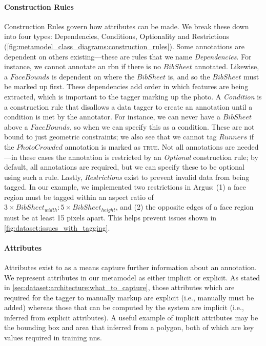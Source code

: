\paragraph{Construction Rules} 

Construction Rules govern how attributes can be made. We break these down into four types: Dependencies, Conditions, Optionality and Restrictions (\cref{fig:metamodel_class_diagrams:construction_rules}). Some annotations are dependent on others existing---these are rules that we name \textit{Dependencies}. For instance, we cannot annotate an \gls{rbn} if there is no $BibSheet$ annotated. Likewise, a $FaceBounds$ is dependent on where the $BibSheet$ is, and so the $BibSheet$ must be marked up first. These dependencies add order in which features are being extracted, which is important to the tagger marking up the photo. A \textit{Condition} is a construction rule that disallows a data tagger to create an annotation until a condition is met by the annotator. For instance, we can never have a $BibSheet$ above a $FaceBounds$, so when we can specify this as a condition. These are not bound to just geometric constraints; we also see that we cannot tag $Runners$ if the $PhotoCrowded$ annotation is marked as \textsc{true}. Not all annotations are needed---in these cases the annotation is restricted by an \textit{Optional} construction rule; by default, all annotations are required, but we can specify these to be optional using such a rule. Lastly, \textit{Restrictions} exist to prevent invalid data from being tagged. In our example, we implemented two restrictions in Argus: (1) a face region must be tagged within an aspect ratio of $3 \times BibSheet_{width} : 5 \times BibSheet_{height}$, and (2) the opposite edges of a face region must be at least 15 pixels apart. This helps prevent issues shown in \cref{fig:dataset:issues_with_tagging}.


\paragraph{Attributes}

Attributes exist to as a means capture further information about an annotation. We represent attributes in our metamodel as either implicit or explicit. As stated in \cref{sec:dataset:architecture:what_to_capture}, those attributes which are required for the tagger to manually markup are explicit (i.e., manually must be added) whereas those that can be computed by the system are implicit (i.e., inferred from explicit attributes). A useful example of implicit attributes may be the bounding box and area that inferred from a polygon, both of which are key values required in training \glspl{nn}.